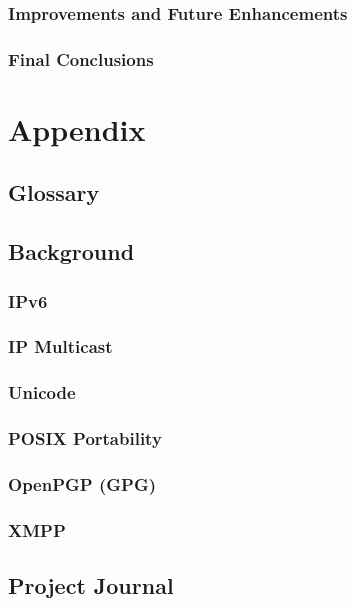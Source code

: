 \documentclass[a4paper,12pt]{report}
\begin{document}
\section{Improvements and Future Enhancements}

\section{Final Conclusions}


\part*{Appendix}

\appendix


\chapter{Glossary}


\chapter{Background}

\section{IPv6}

\section{IP Multicast}

\section{Unicode}

\section{POSIX Portability}

\section{OpenPGP (GPG)}

\section{XMPP}


\chapter{Project Journal}
\end{document}
